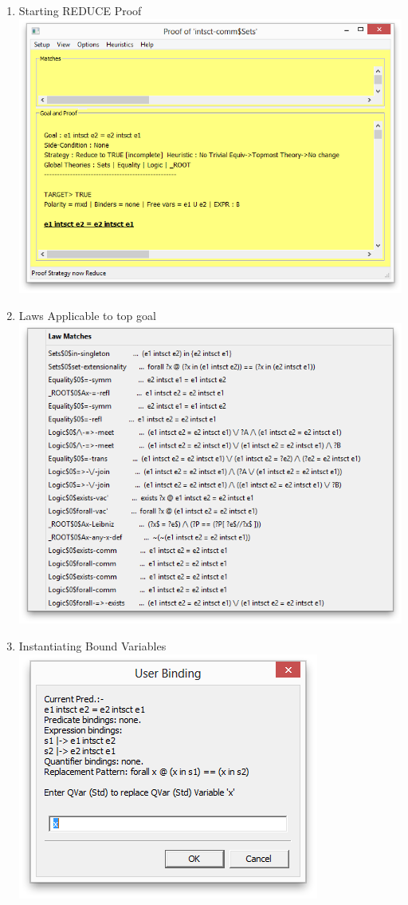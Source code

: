 \begin{enumerate}
  \item Starting REDUCE Proof
  \\\includegraphics[scale=0.5]{SCREENSHOTS/06-starting-REDUCE-proof.png}
  \newpage
  \item Laws Applicable to top goal
  \\\includegraphics[scale=0.5]{SCREENSHOTS/07-laws-applicable-to-goal.png}
  \item Instantiating Bound Variables
  \\\includegraphics[scale=0.5]{SCREENSHOTS/08-instantiating-qvars.png}

\end{enumerate}
